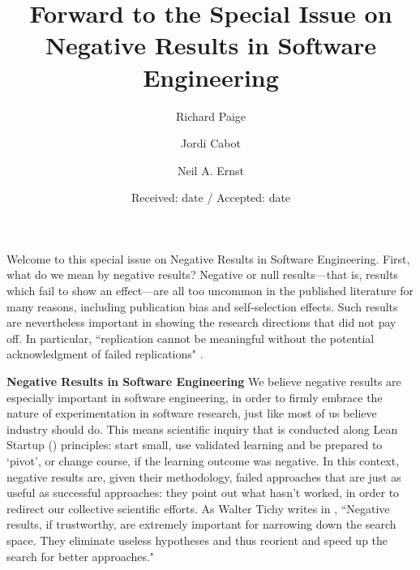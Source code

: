 \documentclass{svjour3}                     %
\begin{document}
\title{Forward to the Special Issue on Negative Results in Software Engineering}

\author{Richard Paige     \and
       Jordi Cabot \and
       Neil A. Ernst
}



\date{Received: date / Accepted: date}
\maketitle


Welcome to this special issue on Negative Results in Software Engineering. First, what do we mean by negative results? Negative or null results---that is, results which fail to show an effect---are all too uncommon in the published literature for many reasons, including publication bias and self-selection effects. Such results are nevertheless important in showing the research directions that did not pay off. In particular, ``replication cannot be meaningful without the potential acknowledgment of failed replications" \cite{LAEW,FH}.

\noindent\textbf{Negative Results in Software Engineering}
We believe negative results are especially important in software engineering, in order to firmly embrace the nature of experimentation in software research, just like most of us believe industry should do. This means scientific inquiry that is conducted along Lean Startup (\cite{ries}) principles: start small, use validated learning and be prepared to `pivot', or change course, if the learning outcome was negative. In this context, negative results are, given their methodology, failed approaches that are just as useful as successful approaches: they point out what hasn't worked, in order to redirect our collective scientific efforts. As Walter Tichy writes in \cite{tichy}, ``Negative results, if trustworthy, are extremely important for narrowing down the search space. They eliminate useless hypotheses and thus reorient and speed up the search for better approaches."
\end{document}
